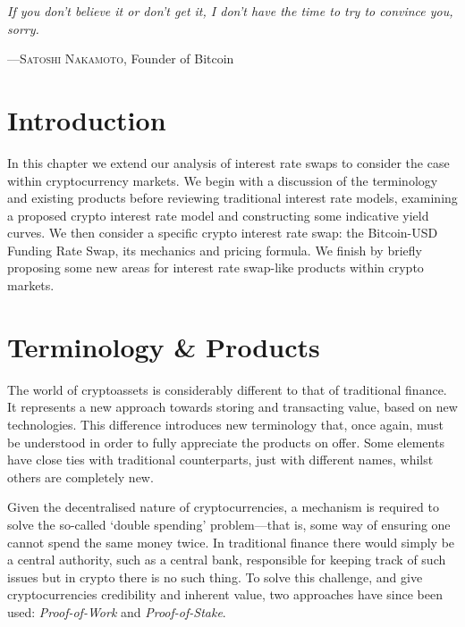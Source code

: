 \epigraph{\textit{If you don’t believe it or don’t get it, I don’t have the time to try to convince you, sorry.}}{––\textsc{Satoshi Nakamoto}, Founder of Bitcoin}

\section{Introduction}
In this chapter we extend our analysis of interest rate swaps to consider the case within cryptocurrency markets. We begin with a discussion of the terminology and existing products before reviewing traditional interest rate models, examining a proposed crypto interest rate model and constructing some indicative yield curves. We then consider a specific crypto interest rate swap: the Bitcoin-USD Funding Rate Swap, its mechanics and pricing formula. We finish by briefly proposing some new areas for interest rate swap-like products within crypto markets. 

\section{Terminology \& Products}
The world of cryptoassets is considerably different to that of traditional finance. It represents a new approach towards storing and transacting value, based on new technologies. This difference introduces new terminology that, once again, must be understood in order to fully appreciate the products on offer. Some elements have close ties with traditional counterparts, just with different names, whilst others are completely new.

Given the decentralised nature of cryptocurrencies, a mechanism is required to solve the so-called `double spending' problem––that is, some way of ensuring one cannot spend the same money twice. In traditional finance there would simply be a central authority, such as a central bank, responsible for keeping track of such issues but in crypto there is no such thing. To solve this challenge, and give cryptocurrencies credibility and inherent value, two approaches have since been used: \textit{Proof-of-Work} and \textit{Proof-of-Stake}.

